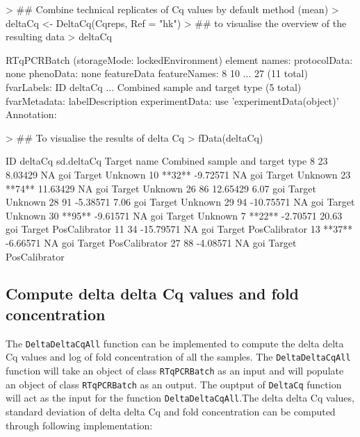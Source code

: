 \documentclass[11pt]{article}
\newcommand{\code}[1]{{\tt #1}}
\begin{document}
\begin{Schunk}
\begin{Sinput}
> ## Combine technical replicates of Cq values by default method (mean)
> deltaCq <- DeltaCq(Cqreps, Ref = "hk")
> ## to visualise the overview of the resulting data
> deltaCq 
\end{Sinput}
\begin{Soutput}
RTqPCRBatch (storageMode: lockedEnvironment)
  element names:  
protocolData: none
phenoData: none
featureData
  featureNames: 8 10 ... 27 (11 total)
  fvarLabels: ID deltaCq ... Combined sample and target type (5 total)
  fvarMetadata: labelDescription
experimentData: use 'experimentData(object)'
Annotation:  
\end{Soutput}
\begin{Sinput}
> ## To visualise the results of delta Cq
> fData(deltaCq) 
\end{Sinput}
\begin{Soutput}
       ID   deltaCq sd.deltaCq Target name Combined sample and target type
8      23   8.03429         NA         goi                  Target Unknown
10 **32**  -9.72571         NA         goi                  Target Unknown
23 **74**  11.63429         NA         goi                  Target Unknown
26     86  12.65429       6.07         goi                  Target Unknown
28     91  -5.38571       7.06         goi                  Target Unknown
29     94 -10.75571         NA         goi                  Target Unknown
30 **95**  -9.61571         NA         goi                  Target Unknown
7  **22**  -2.70571      20.63         goi            Target PosCalibrator
11     34 -15.79571         NA         goi            Target PosCalibrator
13 **37**  -6.66571         NA         goi            Target PosCalibrator
27     88  -4.08571         NA         goi            Target PosCalibrator
\end{Soutput}
\end{Schunk}

\subsection{Compute delta delta Cq values and fold concentration} 
The \code{DeltaDeltaCqAll} function can be implemented to compute the delta delta Cq values and log of 
fold concentration of all the samples. The \code{DeltaDeltaCqAll} function will take an object of class
\code{RTqPCRBatch} as an input and will populate an object of class \code{RTqPCRBatch} as an output.
The ouptput of \code{DeltaCq} function will act as the input for the function \code {DeltaDeltaCqAll}.The 
delta delta Cq values, standard deviation of delta delta Cq and fold concentration can be computed through following implementation:
\end{document}
